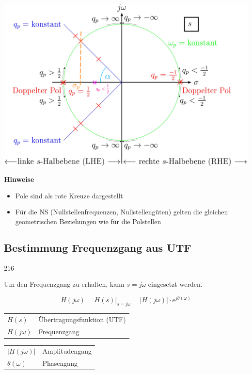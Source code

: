 \begin{minipage}[c]{0.55\columnwidth}
    \includegraphics[width=\columnwidth]{images/pole_nullstellen_koeffizienten.png}
\end{minipage}
\hfill
\begin{minipage}[c]{0.42\columnwidth}
    \raggedright%
    \textbf{Hinweise}
    \begin{itemize}
        \item Pole sind als rote Kreuze dargestellt
        \item Für die NS (Nullstellenfrequenzen, Nullstellengüten) gelten die gleichen
            geometrischen Beziehungen wie für die Polstellen
    \end{itemize}
\end{minipage}




\subsection{Bestimmung Frequenzgang aus UTF}{216}

Um den Frequenzgang zu erhalten, kann $s = j \omega$ eingesetzt werden.

$$ \boxed{ H(j \omega) = H(s) \Big|_{s = j \omega} = |H(j \omega)| \cdot e^{j \theta(\omega)} } $$

\begin{center}
    \begin{tabular}{ll}
        $H(s)$              & Übertragungsfunktion (UTF) \\
        $H(j \omega)$       & Frequenzgang 
    \end{tabular}\hspace{5mm}
    \begin{tabular}{ll}
        $|H(j \omega)|$     & Amplitudengang \\
        $\theta(\omega)$    & Phasengang
    \end{tabular}
\end{center}

